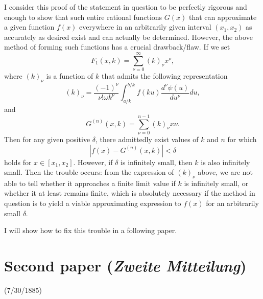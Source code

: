 \documentclass{article}
\begin{document}
I consider this proof of the statement in question to be perfectly rigorous and enough to show that such entire rational functions $G(x)$ that can approximate a given function $f(x)$ everywhere in an arbitrarily given interval $(x_1,x_2)$ as accurately as desired exist and can actually be determined. However, the above method of forming such functions has a crucial drawback/flaw. If we set
\begin{equation*}
F_1(x,k)=\sum_{\nu=0}^\infty (k)_\nu x^\nu,
\end{equation*}
where $(k)_\nu$ is a function of $k$ that admits the following representation
\begin{equation*}
(k)_\nu = \frac{(-1)^\nu}{\nu!\omega k^\nu}\int_{a/k}^{b/k}f(ku)\frac{d^\nu \psi(u)}{du^\nu}du,
\end{equation*}
and
\begin{equation*}
G^{(n)}(x,k)=\sum_{\nu=0}^{n-1}(k)_\nu x\nu.
\end{equation*}
Then for any given positive $\delta$, there admittedly exist values of $k$ and $n$ for which 
\begin{equation*}
|f(x)-G^{(n)}(x,k)|<\delta
\end{equation*}
holds for $x\in[x_1,x_2]$. However, if $\delta$ is infinitely small, then $k$ is also infinitely small. Then the trouble occurs: from the expression of $(k)_\nu$ above, we are not able to tell whether it approaches a finite limit value if $k$ is infinitely small, or whether it at least remains finite, which is absolutely necessary if the method in question is to yield a viable approximating expression to $f(x)$ for an arbitrarily small $\delta$. 

I will show how to fix this trouble in a following paper.


\newpage
\section*{Second paper (\textit{Zweite Mitteilung})}

(7/30/1885)
\end{document}
